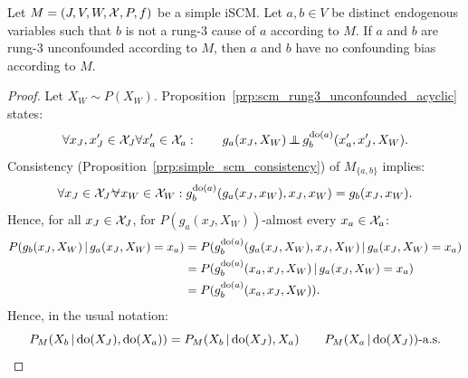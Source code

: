 \begin{Prp}\label{prp:rung3_unconfounded_implies_no_confounding_bias}
  Let $M = \left ( J, V, W, \mathcal{X}, P, f \right )$ be a simple iSCM.
  Let $a,b \in V$ be distinct endogenous variables such that $b$ is not a rung-3 cause of $a$ according to $M$.
  If $a$ and $b$ are rung-3 unconfounded according to $M$, then $a$ and $b$ have no confounding bias according to $M$.
\end{Prp}
\begin{proof}
  Let $X_W \sim P(X_W)$.
  Proposition~\ref{prp:scm_rung3_unconfounded_acyclic} states:
  $$\forall x_J,x_{J}' \in \mathcal{X}_J \forall x_a' \in \mathcal{X}_a : \qquad g_a(x_J,X_W) \operatorname*{\perp\mkern-11mu\perp} g^{\operatorname{do}(a)}_b(x_a',x_{J}',X_W).$$
  Consistency (Proposition~\ref{prp:simple_scm_consistency}) of $M_{\{a,b\}}$ implies:
  $$\forall x_J \in \CX_J \foralmostall x_W \in \CX_W: g_b^{\doit(a)}(g_a(x_J,x_W),x_J,x_W) = g_b(x_J,x_W).$$
  Hence, for all $x_J \in \mathcal{X}_J$, for $P(g_a(x_J,X_W))$-almost every $x_a \in \mathcal{X}_a$:
  \begin{equation*}
    \begin{split}
      P(g_b(x_J,X_W) \operatorname*{|} g_a(x_J,X_W)=x_a) 
      &= P(g_b^{\operatorname{do}(a)}(g_a(x_J,X_W),x_J,X_W) \operatorname*{|} g_a(x_J,X_W)=x_a) \\
      &= P(g_b^{\operatorname{do}(a)}(x_a,x_J,X_W) \operatorname*{|} g_a(x_J,X_W)=x_a) \\
      &= P(g_b^{\operatorname{do}(a)}(x_a,x_J,X_W)).
    \end{split}
  \end{equation*}
  Hence, in the usual notation:
  $$P_{M}(X_b \operatorname*{|} \operatorname{do}(X_J), \operatorname{do}(X_a)) = P_{M}(X_b \operatorname*{|} \operatorname{do}(X_J), X_a) \qquad P_M(X_a \operatorname*{|} \operatorname{do}(X_J))\text{-a.s.}$$
\end{proof}

